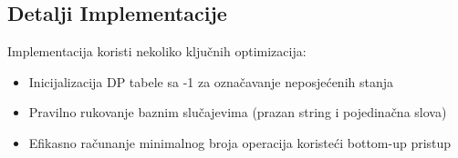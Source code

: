 \subsection{Detalji Implementacije}
Implementacija koristi nekoliko ključnih optimizacija:
\begin{itemize}
    \item Inicijalizacija DP tabele sa -1 za označavanje neposjećenih stanja
    \item Pravilno rukovanje baznim slučajevima (prazan string i pojedinačna slova)
    \item Efikasno računanje minimalnog broja operacija koristeći bottom-up pristup
\end{itemize} 